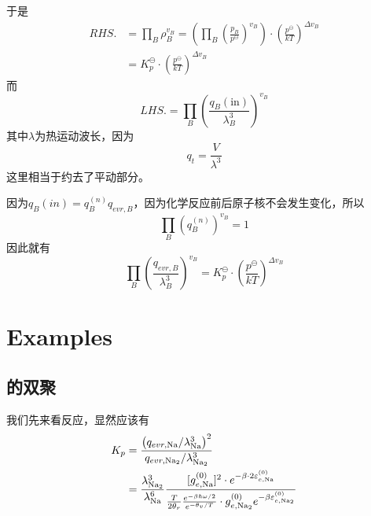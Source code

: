 于是\begin{equation}
    \begin{aligned}
        RHS.&=\prod_B \rho_B^{v_B} =\left(\prod_B \left(\frac{p_B}{p^{\ominus}}\right)^{v_B}\right) \cdot \left(\frac{p^\ominus}{kT}\right)^{\Delta v_B}\\
        &=K_p^\ominus \cdot \left(\frac{p^\ominus}{kT}\right)^{\Delta v_B}
    \end{aligned}
\end{equation}
而\begin{equation}
    LHS.=\prod_B \left(\frac{q_B(\text{in})}{\lambda_B^3}\right)^{v_B}
\end{equation}
其中$\lambda$为热运动波长，因为\begin{equation}
    q_t =\frac{V}{\lambda^3}
\end{equation}这里相当于约去了平动部分。

因为$q_B(in)=q_B^{(n)}q_{evr,B}$，因为化学反应前后原子核不会发生变化，所以\begin{equation}
    \prod_B (q_B^{(n)})^{v_B} =1 
\end{equation}
因此就有\begin{equation}
    \prod_B \left(\frac{q_{evr,B}}{\lambda_B^3}\right)^{v_B}=K_p^{\ominus} \cdot \left(\frac{p^{\ominus}}{kT}\right)^{\Delta v_B}
\end{equation}
\section{Examples} %
\label{sec:Examples}
\subsection{的双聚} %
\label{sub:Na的双聚}
我们先来看反应，显然应该有\begin{equation}
\begin{aligned}
    K_p &= \frac{\left(q_{evr,\ce{Na}}/\lambda^3_{\ce{Na}}\right)^2}{q_{evr,\ce{Na2}}/\lambda_{\ce{Na2}}^3}\\
    &=\frac{\lambda_{\ce{Na2}}^3}{\lambda_{\ce{Na}}^6} \frac{[g_{e,\ce{Na}}^{(0)}]^2 \cdot e^{-\beta \cdot 2 \varepsilon_{e,\ce{Na}}^{(0)}}}{\frac{T}{2\theta_r} \frac{e^{-\beta\hbar\omega/2}}{e^{-\theta_v/T}} \cdot g_{e,\ce{Na2}}^{(0)} e^{-\beta \varepsilon_{e,\ce{Na2}}^{(0)}} }
\end{aligned}
\end{equation}  

